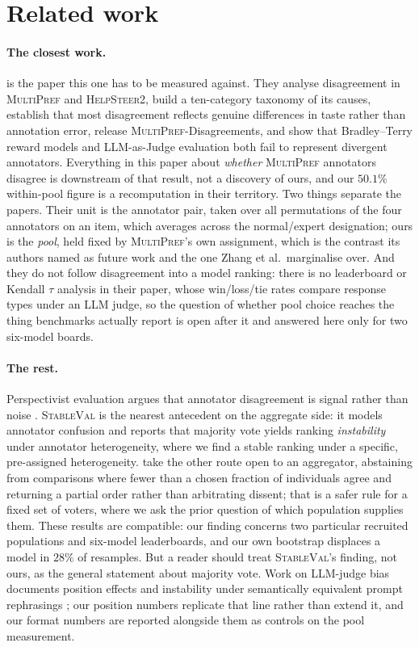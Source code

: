 \documentclass{article}
\begin{document}
\section{Related work}

\paragraph{The closest work.} \citet{zhang2025diverging} is the paper this one has to
be measured against. They analyse disagreement in \textsc{MultiPref} and
\textsc{HelpSteer2}, build a ten-category taxonomy of its causes, establish that most
disagreement reflects genuine differences in taste rather than annotation error, release
\textsc{MultiPref}-Disagreements, and show that Bradley--Terry reward models and
LLM-as-Judge evaluation both fail to represent divergent annotators. Everything in this
paper about \emph{whether} \textsc{MultiPref} annotators disagree is downstream of that
result, not a discovery of ours, and our $50.1\%$ within-pool figure is a recomputation in
their territory. Two things separate the papers. Their unit is the annotator pair, taken
over all permutations of the four annotators on an item, which averages across the
normal/expert designation; ours is the \emph{pool}, held fixed by
\textsc{MultiPref}'s own assignment, which is the contrast its authors named as future work
and the one Zhang et al.\ marginalise over. And they do not follow disagreement into a
model ranking: there is no leaderboard or Kendall $\tau$ analysis in their paper, whose
win/loss/tie rates compare response types under an LLM judge, so the question of whether
pool choice reaches the thing benchmarks actually report is open after it and answered here
only for two six-model boards.

\paragraph{The rest.} Perspectivist evaluation argues that annotator disagreement is signal
rather than noise \citep{perspectivist2026}. \textsc{StableVal} \citep{stableval2026} is
the nearest antecedent on the aggregate side: it models annotator confusion and reports
that majority vote yields ranking \emph{instability} under annotator heterogeneity, where
we find a stable ranking under a specific, pre-assigned heterogeneity.
\citet{kadekodi2025selective} take the other route open to an aggregator, abstaining from
comparisons where fewer than a chosen fraction of individuals agree and returning a partial
order rather than arbitrating dissent; that is a safer rule for a fixed set of voters, where
we ask the prior question of which population supplies them. These results are
compatible: our finding concerns two particular recruited populations and six-model
leaderboards, and our own bootstrap displaces a model in $28\%$ of resamples. But a reader
should treat \textsc{StableVal}'s finding, not ours, as the general statement about
majority vote. Work on LLM-judge
bias documents position effects \citep{positionbias2026} and instability under
semantically equivalent prompt rephrasings \citep{judgesense2026}; our position numbers
replicate that line rather than extend it, and our format numbers are reported alongside
them as controls on the pool measurement.
\end{document}
